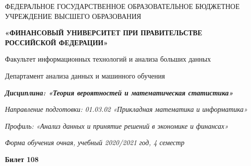 \documentclass[a4paper,14pt]{article}
\begin{document}
\begin{center}
ФЕДЕРАЛЬНОЕ ГОСУДАРСТВЕННОЕ ОБРАЗОВАТЕЛЬНОЕ БЮДЖЕТНОЕ УЧРЕЖДЕНИЕ ВЫСШЕГО ОБРАЗОВАНИЯ

    \textbf{«ФИНАНСОВЫЙ УНИВЕРСИТЕТ ПРИ ПРАВИТЕЛЬСТВЕ РОССИЙСКОЙ ФЕДЕРАЦИИ»}

Факультет информационных технологий и анализа больших данных

Департамент анализа данных и машинного обучения

\textit{
	\textbf{Дисциплина: «Теория вероятностей и математическая статистика»}}

\textit{Направление подготовки: 01.03.02 «Прикладная математика и информатика»}

\textit{Профиль: «Анализ данных и принятие решений в экономике и финансах»}

\textit{Форма обучения очная, учебный 2020/2021 год, 4 семестр}

\textbf{Билет 108}

\end{center}
\end{document}
